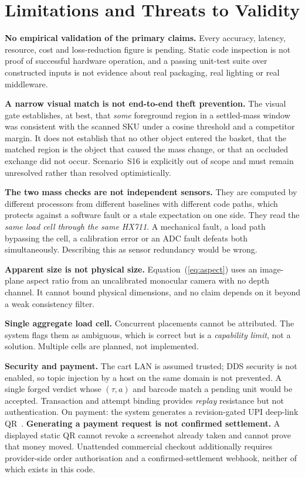 \documentclass[conference]{IEEEtran}
\begin{document}
\section{Limitations and Threats to Validity}
\label{sec:limits}

\textbf{No empirical validation of the primary claims.} Every accuracy, latency, resource, cost and
loss-reduction figure is pending. Static code inspection is not proof of successful hardware
operation, and a passing unit-test suite over constructed inputs is not evidence about real packaging,
real lighting or real middleware.

\textbf{A narrow visual match is not end-to-end theft prevention.} The visual gate establishes, at
best, that \emph{some} foreground region in a settled-mass window was consistent with the scanned SKU
under a cosine threshold and a competitor margin. It does not establish that no other object entered
the basket, that the matched region is the object that caused the mass change, or that an occluded
exchange did not occur. Scenario~S16 is explicitly out of scope and must remain unresolved rather than
resolved optimistically.

\textbf{The two mass checks are not independent sensors.} They are computed by different processors
from different baselines with different code paths, which protects against a software fault or a stale
expectation on one side. They read the \emph{same load cell through the same HX711}. A mechanical
fault, a load path bypassing the cell, a calibration error or an ADC fault defeats both
simultaneously. Describing this as sensor redundancy would be wrong.

\textbf{Apparent size is not physical size.} Equation~(\ref{eq:aspect}) uses an image-plane aspect
ratio from an uncalibrated monocular camera with no depth channel. It cannot bound physical
dimensions, and no claim depends on it beyond a weak consistency filter.

\textbf{Single aggregate load cell.} Concurrent placements cannot be attributed. The system flags them
as ambiguous, which is correct but is a \emph{capability limit}, not a solution. Multiple cells are
planned, not implemented.

\textbf{Security and payment.} The cart LAN is assumed trusted; DDS security is not enabled, so topic
injection by a host on the same domain is not prevented. A single forged verdict whose $(\tau,a)$ and
barcode match a pending unit would be accepted. Transaction and attempt binding provides \emph{replay}
resistance but not authentication. On payment: the system generates a revision-gated UPI deep-link
QR~\cite{R80}. \textbf{Generating a payment request is not confirmed settlement.} A displayed static
QR cannot revoke a screenshot already taken and cannot prove that money moved. Unattended commercial
checkout additionally requires provider-side order authorisation and a confirmed-settlement webhook,
neither of which exists in this code.
\end{document}
